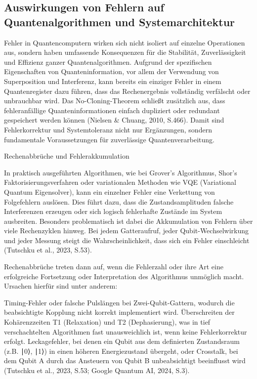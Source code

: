 \subsection{Auswirkungen von Fehlern auf Quantenalgorithmen und Systemarchitektur}
Fehler in Quantencomputern wirken sich nicht isoliert auf einzelne Operationen aus, sondern haben umfassende Konsequenzen für die Stabilität, Zuverlässigkeit und Effizienz ganzer Quantenalgorithmen. Aufgrund der spezifischen Eigenschaften von Quanteninformation, vor allem der Verwendung von Superposition und Interferenz, kann bereits ein einziger Fehler in einem Quantenregister dazu führen, dass das Rechenergebnis vollständig verfälscht oder unbrauchbar wird. Das No-Cloning-Theorem schließt zusätzlich aus, dass fehleranfällige Quanteninformationen einfach dupliziert oder redundant gespeichert werden können (Nielsen & Chuang, 2010, S.466). Damit sind Fehlerkorrektur und Systemtoleranz nicht nur Ergänzungen, sondern fundamentale Voraussetzungen für zuverlässige Quantenverarbeitung.

Rechenabbrüche und Fehlerakkumulation

In praktisch ausgeführten Algorithmen, wie bei Grover’s Algorithmus, Shor’s Faktorisierungsverfahren oder variationalen Methoden wie VQE (Variational Quantum Eigensolver), kann ein einzelner Fehler eine Verkettung von Folgefehlern auslösen. Dies führt dazu, dass die Zustandsamplituden falsche Interferenzen erzeugen oder sich logisch fehlerhafte Zustände im System ausbreiten. Besonders problematisch ist dabei die Akkumulation von Fehlern über viele Rechenzyklen hinweg. Bei jedem Gatteraufruf, jeder Qubit-Wechselwirkung und jeder Messung steigt die Wahrscheinlichkeit, dass sich ein Fehler einschleicht (Tutschku et al., 2023, S.53).

Rechenabbrüche treten dann auf, wenn die Fehlerzahl oder ihre Art eine erfolgreiche Fortsetzung oder Interpretation des Algorithmus unmöglich macht. Ursachen hierfür sind unter anderem:

Timing-Fehler oder falsche Pulslängen bei Zwei-Qubit-Gattern, wodurch die beabsichtigte Kopplung nicht korrekt implementiert wird.
Überschreiten der Kohärenzzeiten T1 (Relaxation) und T2 (Dephasierung), was in tief verschachtelten Algorithmen fast unausweichlich ist, wenn keine Fehlerkorrektur erfolgt.
Leckagefehler, bei denen ein Qubit aus dem definierten Zustandsraum (z.B. ∣0⟩, ∣1⟩) in einen höheren Energiezustand übergeht, oder Crosstalk, bei dem Qubit A durch das Ansteuern von Qubit B unbeabsichtigt beeinflusst wird (Tutschku et al., 2023, S.53; Google Quantum AI, 2024, S.3).

